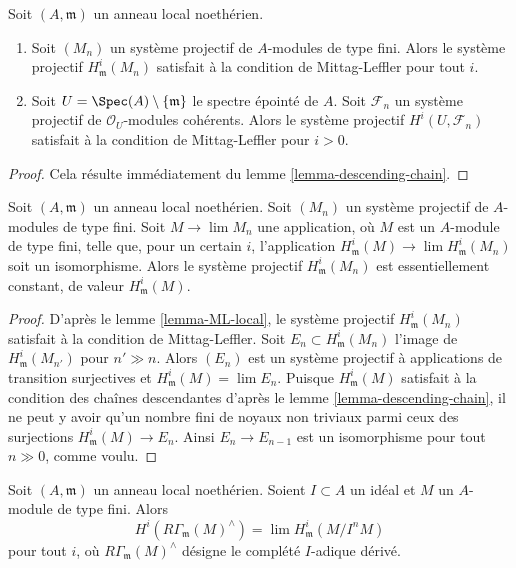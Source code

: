 \begin{lemma}
\label{lemma-ML-local}
Soit $(A, \mathfrak m)$ un anneau local noethérien.
\begin{enumerate}
\item Soit $(M_n)$ un système projectif de $A$-modules de type fini. Alors le
système projectif $H^i_\mathfrak m(M_n)$ satisfait à la condition de Mittag-Leffler
pour tout $i$.
\item Soit $U = \Spec(A) \setminus \{\mathfrak m\}$ le
spectre épointé de $A$.
Soit $\mathcal{F}_n$ un système projectif de
$\mathcal{O}_U$-modules cohérents.
Alors le système projectif $H^i(U, \mathcal{F}_n)$
satisfait à la condition de Mittag-Leffler pour $i > 0$.
\end{enumerate}
\end{lemma}

\begin{proof}
Cela résulte immédiatement du lemme \ref{lemma-descending-chain}.
\end{proof}

\begin{lemma}
\label{lemma-terrific}
Soit $(A, \mathfrak m)$ un anneau local noethérien.
Soit $(M_n)$ un système projectif de $A$-modules de type fini.
Soit $M \to \lim M_n$ une application, où $M$ est un $A$-module de type fini,
telle que, pour un certain $i$, l'application
$H^i_\mathfrak m(M) \to \lim H^i_\mathfrak m(M_n)$
soit un isomorphisme.
Alors le système projectif $H^i_\mathfrak m(M_n)$
est essentiellement constant, de valeur $H^i_\mathfrak m(M)$.
\end{lemma}

\begin{proof}
D'après le lemme \ref{lemma-ML-local}, le système projectif $H^i_\mathfrak m(M_n)$
satisfait à la condition de Mittag-Leffler. Soit $E_n \subset H^i_\mathfrak m(M_n)$
l'image de $H^i_\mathfrak m(M_{n'})$ pour $n' \gg n$.
Alors $(E_n)$ est un système projectif à applications de transition surjectives
et $H^i_\mathfrak m(M) = \lim E_n$. Puisque $H^i_\mathfrak m(M)$
satisfait à la condition des chaînes descendantes d'après le
lemme \ref{lemma-descending-chain},
il ne peut y avoir qu'un nombre fini de noyaux non triviaux
parmi ceux des surjections $H^i_\mathfrak m(M) \to E_n$.
Ainsi $E_n \to E_{n - 1}$ est un isomorphisme pour tout $n \gg 0$,
comme voulu.
\end{proof}

\begin{lemma}
\label{lemma-local-cohomology-derived-completion}
Soit $(A, \mathfrak m)$ un anneau local noethérien.
Soient $I \subset A$ un idéal et $M$ un $A$-module de type fini.
Alors
$$
H^i(R\Gamma_\mathfrak m(M)^\wedge) = \lim H^i_\mathfrak m(M/I^nM)
$$
pour tout $i$, où $R\Gamma_\mathfrak m(M)^\wedge$ désigne
le complété $I$-adique dérivé.
\end{lemma}


